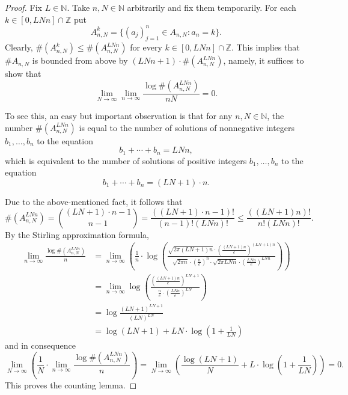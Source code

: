 \documentclass[10pt,a4paper]{amsart}
\begin{document}
\begin{proof}
Fix $L\in\mathbb{N}$. Take $n,N\in\mathbb{N}$ arbitrarily and fix them temporarily. For each $k\in[0,LNn]\cap\mathbb{Z}$ put $$A_{n,N}^k=\{(a_j)_{j=1}^n\in A_{n,N}:a_n=k\}.$$ Clearly, $\#(A_{n,N}^k)\le\#(A_{n,N}^{LNn})$ for every $k\in[0,LNn]\cap\mathbb{Z}$. This implies that $\#A_{n,N}$ is bounded from above by $(LNn+1)\cdot\#(A_{n,N}^{LNn})$, namely, it suffices to show that $$\lim_{N\to\infty}\lim_{n\to\infty}\frac{\log\#(A_{n,N}^{LNn})}{nN}=0.$$

To see this, an easy but important observation is that for any $n,N\in\mathbb{N}$, the number $\#(A_{n,N}^{LNn})$ is equal to the number of solutions of nonnegative integers $b_1,\dots,b_n$ to the equation $$b_1+\cdots+b_n=LNn,$$ which is equivalent to the number of solutions of positive integers $b_1,\dots,b_n$ to the equation $$b_1+\cdots+b_n=(LN+1)\cdot n.$$

Due to the above-mentioned fact, it follows that $$\#(A_{n,N}^{LNn})={(LN+1)\cdot n-1\choose n-1}=\frac{((LN+1)\cdot n-1)!}{(n-1)!(LNn)!}\le\frac{((LN+1)n)!}{n!(LNn)!}.$$ By the Stirling approximation formula,
\begin{align*}
\lim_{n\to\infty}\frac{\log\#(A_{n,N}^{LNn})}{n}
&=\lim_{n\to\infty}\left(\frac1n\cdot\log\left(\frac{\sqrt{2\pi(LN+1)n}\cdot(\frac{(LN+1)n}{e})^{(LN+1)n}}{\sqrt{2\pi n}\cdot(\frac{n}{e})^n\cdot\sqrt{2\pi LNn}\cdot(\frac{LNn}{e})^{LNn}}\right)\right)\\
&=\lim_{n\to\infty}\log\left(\frac{(\frac{(LN+1)n}{e})^{LN+1}}{\frac{n}{e}\cdot(\frac{LNn}{e})^{LN}}\right)\\
&=\log\frac{(LN+1)^{LN+1}}{(LN)^{LN}}\\
&=\log(LN+1)+LN\cdot\log\left(1+\frac{1}{LN}\right)
\end{align*}
and in consequence
$$\lim_{N\to\infty}\left(\frac1N\cdot\lim_{n\to\infty}\frac{\log\#(A_{n,N}^{LNn})}{n}\right)=\lim_{N\to\infty}\left(\frac{\log(LN+1)}{N}+L\cdot\log\left(1+\frac{1}{LN}\right)\right)=0.$$
This proves the counting lemma.
\end{proof}
\end{document}
